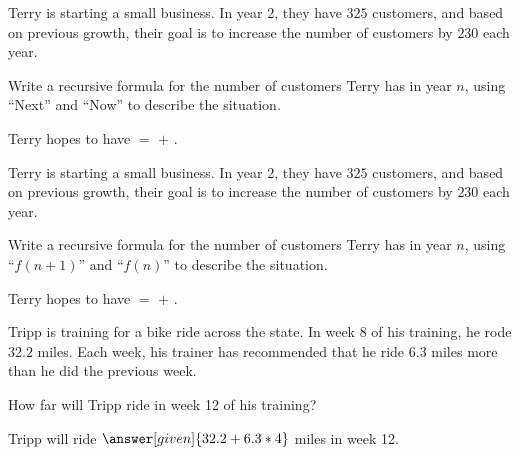 \documentclass[nooutcomes]{ximera}
\begin{document}
\begin{problem}
Terry is starting a small business.  In year $2$, they have $325$ customers, and based on previous growth, their goal is to increase the number of customers by $230$ each year.


Write a recursive formula for the number of customers Terry has in year $n$, using ``Next'' and ``Now'' to describe the situation.

\begin{prompt}
Terry hopes to have  $=$  $+$ .
\end{prompt}
\end{problem}



\begin{problem}
Terry is starting a small business.  In year $2$, they have $325$ customers, and based on previous growth, their goal is to increase the number of customers by $230$ each year.


Write a recursive formula for the number of customers Terry has in year $n$, using ``$f(n+1)$'' and ``$f(n)$'' to describe the situation.

\begin{prompt}
Terry hopes to have  $=$  $+$ .
\end{prompt}
\end{problem}





\begin{problem}
Tripp is training for a bike ride across the state.  In week 8 of his training, he rode $32.2$ miles.  Each week, his trainer has recommended that he ride $6.3$ miles more than he did the previous week.

How far will Tripp ride in week 12 of his training?

\begin{prompt}
Tripp will ride $\answer[given]{32.2 + 6.3*4}$ miles in week 12.
\end{prompt}
\end{problem}
\end{document}
